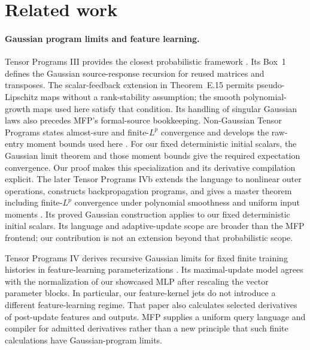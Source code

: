 \section{Related work}

\paragraph{Gaussian program limits and feature learning.}
Tensor Programs III provides the closest probabilistic framework
\cite{yang2021tp3}. Its Box~1 defines the Gaussian source-response
recursion for reused matrices and transposes. The scalar-feedback extension
in Theorem~E.15 permits pseudo-Lipschitz maps without a rank-stability
assumption; the smooth polynomial-growth maps used here satisfy that
condition. Its handling of singular Gaussian laws also precedes MFP's
formal-source bookkeeping. Non-Gaussian Tensor Programs states almost-sure
and finite-$L^p$ convergence and develops the raw-entry moment bounds used
here \cite{golikov2022nongaus}. For our fixed deterministic initial scalars,
the Gaussian limit theorem and those moment bounds give the required
expectation convergence. Our proof makes this specialization and its
derivative compilation explicit. The later Tensor Programs IVb extends
the language to nonlinear outer operations, constructs backpropagation
programs, and gives a master theorem including finite-$L^p$ convergence
under polynomial smoothness and uniform input moments
\cite{yang2023tp4b}. Its proved Gaussian construction applies to our fixed
deterministic initial scalars. Its language and adaptive-update scope are
broader than the MFP frontend; our contribution is not an extension beyond
that probabilistic scope.

Tensor Programs IV derives recursive Gaussian limits for fixed finite
training histories in feature-learning parameterizations
\cite{yang2021tp4}. Its maximal-update model agrees with the normalization
of our showcased MLP after rescaling the vector parameter blocks. In
particular, our feature-kernel jets do not introduce a different
feature-learning regime. That paper also calculates selected derivatives
of post-update features and outputs. MFP supplies a uniform query language
and compiler for admitted derivatives rather than a new principle that
such finite calculations have Gaussian-program limits.

